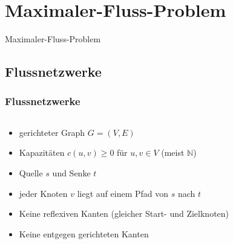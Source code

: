 \documentclass{beamer}
\begin{document}
\section{Maximaler-Fluss-Problem}
\begin{frame}[plain]
\begin{center}
\begin{LARGE}
Maximaler-Fluss-Problem
\end{LARGE}
\end{center}
\end{frame}

\subsection{Flussnetzwerke}
\begin{frame}
\frametitle{Flussnetzwerke}
\begin{columns}
\begin{column}{.45\textwidth}
\begin{itemize}
\item<1-> gerichteter Graph $G=(V,E)$
\item<2-> Kapazitäten $c(u,v) \geq 0$ für $u,v \in V$ (meist $\mathbb{N}$)
\item<3-> Quelle $s$ und Senke $t$
\item<4-> jeder Knoten $v$ liegt auf einem Pfad von $s$ nach $t$
\item<5-> Keine reflexiven Kanten (gleicher Start- und Zielknoten)
\item<6-> Keine entgegen gerichteten Kanten
\end{itemize}
\end{column}
\begin{column}{.6\textwidth}
\begin{adjustbox}{width=\textwidth}
\end{adjustbox}
\end{column}
\end{columns}
\end{frame}
\end{document}
